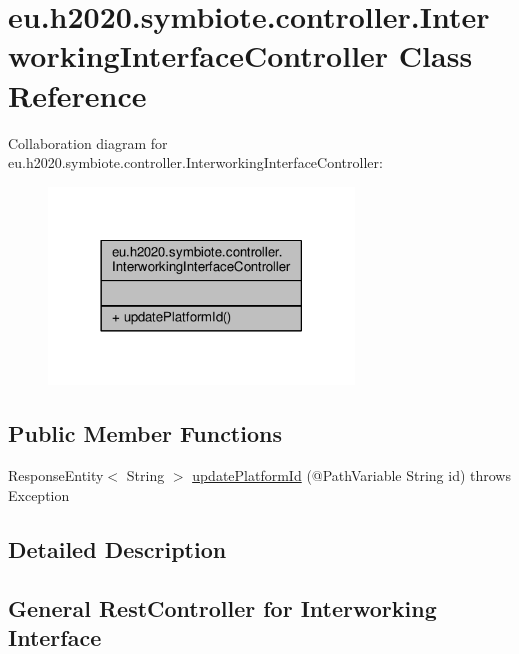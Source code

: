 \hypertarget{classeu_1_1h2020_1_1symbiote_1_1controller_1_1InterworkingInterfaceController}{}\section{eu.\+h2020.\+symbiote.\+controller.\+Interworking\+Interface\+Controller Class Reference}
\label{classeu_1_1h2020_1_1symbiote_1_1controller_1_1InterworkingInterfaceController}


Collaboration diagram for eu.\+h2020.\+symbiote.\+controller.\+Interworking\+Interface\+Controller\+:\nopagebreak
\begin{figure}[H]
\begin{center}
\leavevmode
\includegraphics[width=230pt]{classeu_1_1h2020_1_1symbiote_1_1controller_1_1InterworkingInterfaceController__coll__graph}
\end{center}
\end{figure}
\subsection*{Public Member Functions}
\begin{DoxyCompactItemize}
\item 
Response\+Entity$<$ String $>$ \hyperlink{classeu_1_1h2020_1_1symbiote_1_1controller_1_1InterworkingInterfaceController_a6ff9bf0ef30e7e2a34b2d89e77399a59}{update\+Platform\+Id} (@Path\+Variable String id)  throws Exception 
\end{DoxyCompactItemize}


\subsection{Detailed Description}
\subsection*{General Rest\+Controller for Interworking Interface}

